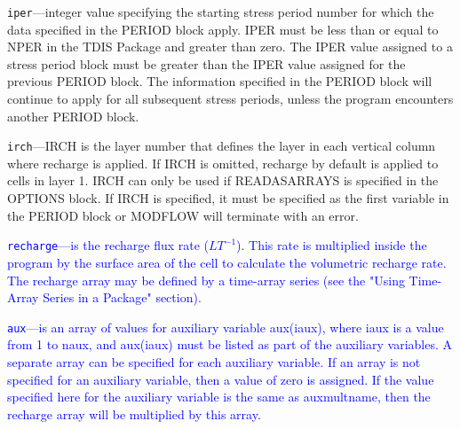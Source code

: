 \begin{description}
\item \texttt{iper}---integer value specifying the starting stress period number for which the data specified in the PERIOD block apply.  IPER must be less than or equal to NPER in the TDIS Package and greater than zero.  The IPER value assigned to a stress period block must be greater than the IPER value assigned for the previous PERIOD block.  The information specified in the PERIOD block will continue to apply for all subsequent stress periods, unless the program encounters another PERIOD block.

\item \texttt{irch}---IRCH is the layer number that defines the layer in each vertical column where recharge is applied. If IRCH is omitted, recharge by default is applied to cells in layer 1.  IRCH can only be used if READASARRAYS is specified in the OPTIONS block.  If IRCH is specified, it must be specified as the first variable in the PERIOD block or MODFLOW will terminate with an error.

\item \textcolor{blue}{\texttt{recharge}---is the recharge flux rate ($LT^{-1}$).  This rate is multiplied inside the program by the surface area of the cell to calculate the volumetric recharge rate. The recharge array may be defined by a time-array series (see the "Using Time-Array Series in a Package" section).}

\item \textcolor{blue}{\texttt{aux}---is an array of values for auxiliary variable aux(iaux), where iaux is a value from 1 to naux, and aux(iaux) must be listed as part of the auxiliary variables.  A separate array can be specified for each auxiliary variable.  If an array is not specified for an auxiliary variable, then a value of zero is assigned.  If the value specified here for the auxiliary variable is the same as auxmultname, then the recharge array will be multiplied by this array.}

\end{description}

